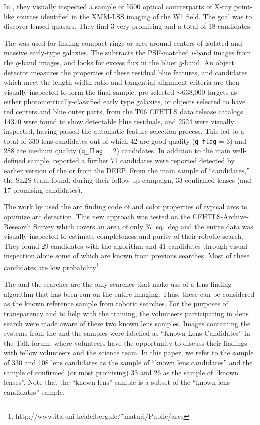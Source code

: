 \documentclass[useAMS,usenatbib,a4paper]{mn2e}
\begin{document}
In \citet{Elyiv2013}, they visually inspected a sample of 5500 optical
counterparts of X-ray point-like sources identified in the XMM-LSS
imaging of the \cfhtls W1 field. The goal was to discover lensed
quasars. They find 3 very promising and a total of 18 candidates. 

The \rf \citep{Gavazzi2014} was used for finding compact rings or arcs
around centers of isolated and massive early-type galaxies. The \rf
subtracts the PSF-matched $i$-band images from the $g$-band images, and
looks for excess flux in the bluer $g$-band. An object detector measures
the properties of these residual blue features, and candidates which
meet the length-width ratio and tangential alignment criteria are then
visually inspected to form the final sample. \citet{Gavazzi2014}
pre-selected $\sim$638,000 targets as either photometrically-classified
early type galaxies, or objects selected to have red centers and blue
outer parts, from the T06 CFHTLS data release catalogs.  14370 were
found to show detectable blue residuals, and 2524 were visually
inspected, having passed the automatic feature selection process. This
led to a total of 330 lens candidates out of which 42 are good quality
(\texttt{q\_flag} = 3) and 288 are medium quality (\texttt{q\_flag} = 2)
candidates. In addition to the main well-defined sample,
\citet{Gavazzi2014} reported a further 71 candidates were reported
detected by earlier version of the \rf or from the \cfhtls DEEP.  From
the main sample of ``\rf candidates,'' the SL2S team found, during their
follow-up campaign, 33 confirmed lenses (and 17 promising candidates).

The work by \citet{Maturi2014} used the arc finding code of
\citet{Seidel2007} and color properties of typical arcs to optimize arc
detection. This new approach was tested on the CFHTLS-Archive-Research
Survey \citep[CARS,][]{Erben2009} which covers an area of only 37~sq.~deg
and the entire data was visually inspected to estimate completeness and
purity of their robotic search. They found 29 candidates with the
algorithm and 41 candidates through visual inspection alone some of
which are known from previous searches. Most of these candidates are low
probability\footnote{http://www.ita.uni-heidelberg.de/˜maturi/Public/arcs}.

The \rf and the \af searches are the only searches that make use of a
lens finding algorithm that has been run on the entire \cfhtls imaging.
Thus, these can be considered as the known reference sample from robotic
searches.  For the purposes of transparency and to help with the
training, the volunteers participating in \sw-\cfhtls lens search were
made aware of these two known lens samples. Images containing the
systems from the \rf and the \af samples were labelled as ``Known Lens
Candidates'' in the Talk forum, where volunteers have the opportunity to
discuss their findings with fellow volunteers and the science team. In
this paper, we refer to the sample of 330 \rf and 108 \af lens
candidates as the sample of ``known lens candidates'' and the sample of
confirmed (or most promising) 33 \rf and 26 \af as the sample of ``known
lenses''. Note that the ``known lens'' sample is a subset of the ``known lens
candidates'' sample.
\end{document}
